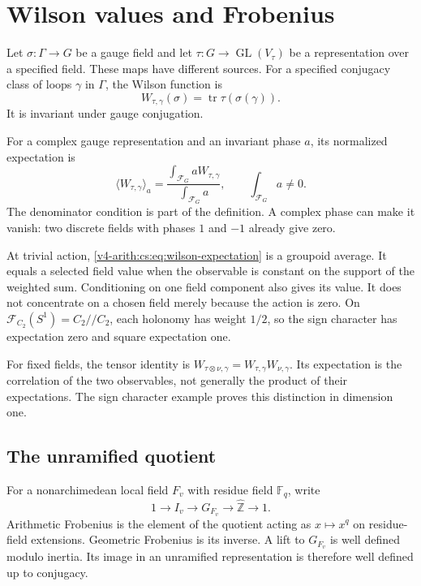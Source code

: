 \section{Wilson values and Frobenius}
\label{v4-arith:cs:wilson}

Let \(\sigma:\Gamma\to G\) be a gauge field and let
\(\tau:G\to\operatorname{GL}(V_\tau)\) be a representation over a specified
field. These maps have different sources. For a specified conjugacy class of
loops \(\gamma\) in \(\Gamma\), the Wilson function is
\begin{equation}
 W_{\tau,\gamma}(\sigma)
       =\operatorname{tr}\tau(\sigma(\gamma)).
 \label{v4-arith:cs:eq:wilson-value}
\end{equation}
It is invariant under gauge conjugation.

For a complex gauge representation and an invariant phase \(a\), its
normalized expectation is
\begin{equation}
 \langle W_{\tau,\gamma}\rangle_a
    =\frac{\displaystyle\int_{\mathcal F_G}aW_{\tau,\gamma}}
           {\displaystyle\int_{\mathcal F_G}a},
 \qquad \int_{\mathcal F_G}a\ne0.
 \label{v4-arith:cs:eq:wilson-expectation}
\end{equation}
The denominator condition is part of the definition. A complex phase can
make it vanish: two discrete fields with phases \(1\) and \(-1\) already
give zero.

At trivial action, \eqref{v4-arith:cs:eq:wilson-expectation} is a groupoid
average. It equals a selected field value when the observable is constant on
the support of the weighted sum. Conditioning on one field component also
gives its value. It does not concentrate on a chosen field merely because
the action is zero. On \(\mathcal F_{C_2}(S^1)=C_2//C_2\), each holonomy has
weight \(1/2\), so the sign character has expectation zero and square
expectation one.

For fixed fields, the tensor identity is
\(W_{\tau\otimes\nu,\gamma}=W_{\tau,\gamma}W_{\nu,\gamma}\). Its expectation
is the correlation of the two observables, not generally the product of
their expectations. The sign character example proves this distinction in
dimension one.

\subsection{The unramified quotient}

For a nonarchimedean local field \(F_v\) with residue field \(\mathbb F_q\),
write
\[
 1\longrightarrow I_v\longrightarrow G_{F_v}
       \longrightarrow\widehat{\mathbb Z}\longrightarrow1.
\]
Arithmetic Frobenius is the element of the quotient acting as \(x\mapsto
x^q\) on residue-field extensions. Geometric Frobenius is its inverse. A
lift to \(G_{F_v}\) is well defined modulo inertia. Its image in an
unramified representation is therefore well defined up to conjugacy.

